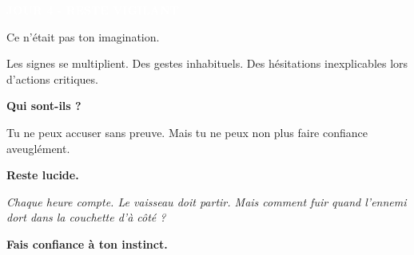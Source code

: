 \documentclass[a4paper,10pt]{article}
\newcommand{\fichenonparasite}[1]{
\colorbox{safecolor}{\textcolor{white}{\textbf{#1}}}
}
\begin{document}
\begin{minipage}[t]{0.48\textwidth}
\raggedright
\fichenonparasite{JOUR 4 - RESTE VIGILANT}

\vspace{0.3cm}

Ce n'était pas ton imagination.

\vspace{0.2cm}

Les signes se multiplient. Des gestes inhabituels. Des hésitations inexplicables lors d'actions critiques.

\vspace{0.2cm}

\textbf{Qui sont-ils ?}

\vspace{0.2cm}

Tu ne peux accuser sans preuve. Mais tu ne peux non plus faire confiance aveuglément.

\vspace{0.2cm}

\textbf{Reste lucide.}

\vspace{0.2cm}

\textit{Chaque heure compte. Le vaisseau doit partir. Mais comment fuir quand l'ennemi dort dans la couchette d'à côté ?}

\vspace{0.3cm}

\textbf{Fais confiance à ton instinct.}
\end{minipage}

\newpage
\end{document}
